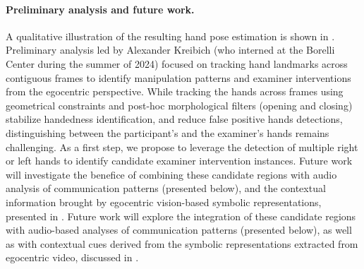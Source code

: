 \paragraph{Preliminary analysis and future work.\\}

A qualitative illustration of the resulting hand pose estimation is shown in . Preliminary analysis led by Alexander Kreibich (who interned at the Borelli Center during the summer of 2024) focused on tracking hand landmarks across contiguous frames to identify manipulation patterns and examiner interventions from the egocentric perspective. While tracking the hands across frames using geometrical constraints and post-hoc morphological filters (opening and closing) stabilize handedness identification, and reduce false positive hands detections, distinguishing between the participant’s and the examiner’s hands remains challenging. As a first step, we propose to leverage the detection of multiple right or left hands to identify candidate examiner intervention instances. Future work will investigate the benefice of combining these candidate regions with audio analysis of communication patterns (presented below), and the contextual information brought by egocentric vision-based symbolic representations, presented in .
Future work will explore the integration of these candidate regions with audio-based analyses of communication patterns (presented below), as well as with contextual cues derived from the symbolic representations extracted from egocentric video, discussed in .






